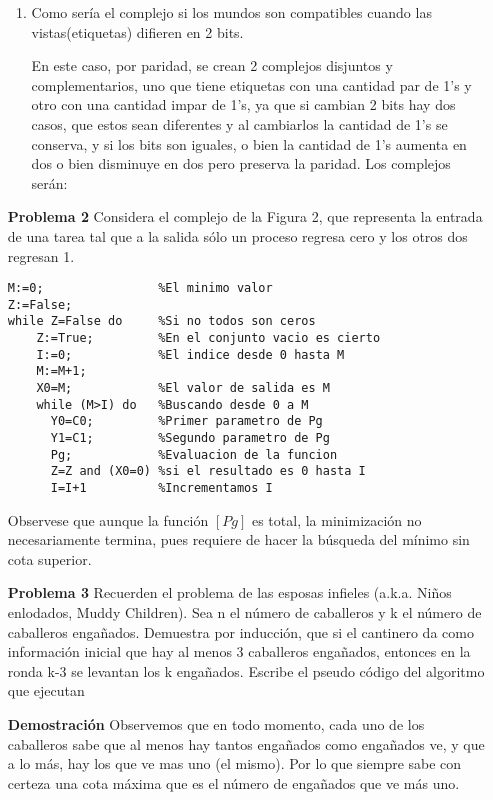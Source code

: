 \documentclass{article}
\begin{document}
\begin{enumerate}
\begin{enumerate}
\item{Como sería el complejo si los mundos son compatibles cuando las vistas(etiquetas) difieren en 2 bits.}

En este caso, por paridad, se crean 2 complejos disjuntos y complementarios, uno que tiene etiquetas con una cantidad par de 1's y otro con una cantidad impar de 1's, ya que si cambian 2 bits hay dos casos, que estos sean diferentes y al cambiarlos la cantidad de 1's se conserva, y si los bits son iguales, o bien la cantidad de 1's aumenta en dos o bien disminuye en dos pero preserva la paridad. Los complejos serán:

\end{enumerate}

\item[\bf{Problema 2}] Considera el complejo de la Figura 2, que representa la entrada de una tarea tal que a la salida sólo un proceso regresa cero y los otros dos regresan 1.

\begin{lstlisting}[frame=single] 
M:=0;                %El minimo valor
Z:=False;           
while Z=False do     %Si no todos son ceros
    Z:=True;         %En el conjunto vacio es cierto
    I:=0;            %El indice desde 0 hasta M
    M:=M+1;         
    X0=M;            %El valor de salida es M 
    while (M>I) do   %Buscando desde 0 a M
      Y0=C0;         %Primer parametro de Pg
      Y1=C1;         %Segundo parametro de Pg
      Pg;            %Evaluacion de la funcion       
      Z=Z and (X0=0) %si el resultado es 0 hasta I
      I=I+1          %Incrementamos I
\end{lstlisting}
Observese que aunque la función $[Pg]$ es total, la minimización no necesariamente termina, pues requiere de hacer la búsqueda del mínimo sin cota superior.

\item[\bf{Problema 3}] Recuerden el problema de las esposas infieles (a.k.a. Niños enlodados, Muddy Children). Sea n el número de caballeros y k el número de caballeros engañados. Demuestra por inducción, que si el cantinero da como información inicial que hay al menos 3 caballeros engañados, entonces en la ronda k-3 se levantan los k engañados. Escribe el pseudo código del algoritmo que ejecutan

\item[\bf{Demostración}] 
Observemos que en todo momento, cada uno de los caballeros sabe que al menos hay tantos engañados como engañados ve, y que a lo más, hay los que ve mas uno (el mismo).
Por lo que siempre sabe con certeza una cota máxima que es el número de engañados que ve más uno.


\end{enumerate}
\end{document}
